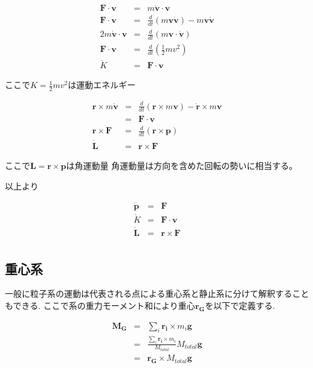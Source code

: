\documentclass[dvipdfmx]{jsarticle}
\begin{document}
\begin{cor}
\begin{eqnarray*}
\bm{F} \cdot \bm{v} &=& m \dot{\bm{v}} \cdot \bm{v} \\
\bm{F} \cdot \bm{v} &=& \frac{d}{dt}(m\bm{v}\bm{\dot{v}}) - m\bm{v}\bm{\dot{v}} \\
2m\bm{\dot{v}} \cdot \bm{v} &=& \frac{d}{dt}(m\bm{v} \cdot \bm{\dot{v}}) \\
\bm{F} \cdot \bm{v} &=& \frac{d}{dt} \left( \frac{1}{2}mv^2 \right) \\
\dot{K} &=& \bm{F} \cdot \bm{v}
\end{eqnarray*}
\end{cor}
ここで$K=\frac{1}{2}mv^2$は運動エネルギー

\begin{cor}
\begin{eqnarray*}
\bm{r} \times m\bm{\dot{v}} &=& \frac{d}{dt}(\bm{r} \times m\bm{v}) - \bm{\dot{r}} \times m\bm{v} \\
&=& \bm{F} \cdot \bm{v} \\
\bm{r} \times \bm{F} &=& \frac{d}{dt}(\bm{r} \times \bm{p}) \\
\dot{\bm{L}} &=& \bm{r} \times \bm{F}
\end{eqnarray*}
\end{cor}
ここで$\bm{L} = \bm{r} \times \bm{p}$は角運動量
角運動量は方向を含めた回転の勢いに相当する。

以上より
\begin{theo}
\begin{eqnarray*}
\bm{\dot{p}} &=& \bm{F} \\
\dot{K} &=& \bm{F} \cdot \bm{v} \\
\bm{\dot{L}} &=& \bm{r} \times \bm{F} \\
\end{eqnarray*}
\end{theo}

\subsection{重心系}
一般に粒子系の運動は代表される点による重心系と静止系に分けて解釈することもできる.
ここで系の重力モーメント和により重心$ \bm{r_G} $を以下で定義する.

\begin{eqnarray*}
\bm{M_G} &=& \sum_i \bm{r_i} \times m_i \bm{g} \\
&=& \frac{\sum_i \bm{r_i} \times m_i}{M_{total}} M_{total} \bm{g} \\
&=& \bm{r_G} \times M_{total} \bm{g}
\end{eqnarray*}
\end{document}
